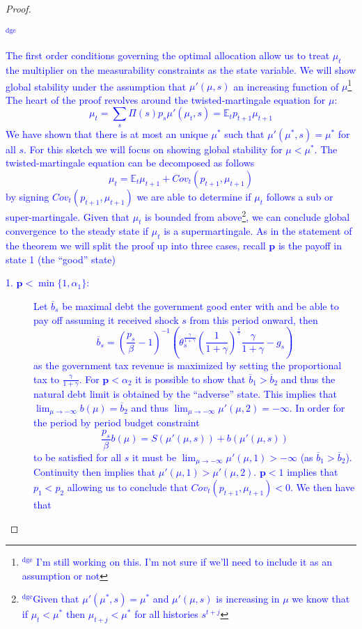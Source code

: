 \documentclass[12pt]{article}
\newcommand{\dge}[1]{\textcolor{blue}{$^{\textrm{dge}}${#1}}}
\newcommand{\EE}{\mathbb E}
\begin{document}
\begin{proof}\dge{The first order conditions governing the optimal allocation allow us to treat $\mu_t$ the multiplier on the measurability constraints as the state variable.  We will show global stability under the assumption that $\mu'(\mu,s)$ an increasing function of $\mu$\footnote{\dge{ I'm still working on this.  I'm not sure if we'll need to include it as an assumption or not}}  The heart of the proof revolves around the twisted-martingale equation for $\mu$:
\[
	\mu_t = \sum_s \Pi(s) p_s \mu'(\mu_t,s) = \EE_t p_{t+1}\mu_{t+1}
\]  We have shown that there is at most an unique $\mu^*$ such that $\mu'(\mu^*,s) = \mu^*$ for all $s$.  For this sketch we will focus on showing global stability for $\mu < \mu^*$.  The twisted-martingale equation can be decomposed as follows
\[ 
	\mu_t = \EE_t \mu_{t+1}+Cov_t(p_{t+1},\mu_{t+1})
\] by signing $Cov_t(p_{t+1},\mu_{t+1})$ we are able to determine if $\mu_t$ follows a sub or super-martingale.  Given that $\mu_t$ is bounded from above\footnote{\dge{Given that $\mu'(\mu^*,s) = \mu^*$ and $\mu'(\mu,s)$ is increasing in $\mu$  we know that if $\mu_t < \mu^*$ then $\mu_{t+j} < \mu^*$ for all histories $s^{t+j}$}}, we can conclude global convergence to the steady state if $\mu_t$ is a supermartingale.  As in the statement of the theorem we will split the proof up into three cases, recall $\bm p$ is the payoff in state 1 (the ``good'' state)
\begin{description}
	\item[1. $\bm p < \min\{1,\alpha_1\}$:]  Let $\overline b_s$ be maximal debt the government good enter with and be able to pay off assuming it received shock $s$ from this period onward, then
	\[
	\overline b_s = \left(\frac{p_s}{\beta}-1\right)^{-1}\left(\theta_s^\frac{\gamma}{1+\gamma}\left(\frac1{1+\gamma}\right)^\frac1\gamma\frac\gamma{1+\gamma}-g_s\right)
	\]as the government tax revenue is maximized by setting the proportional tax to $\frac\gamma{1+\gamma}$.  For $\bm p <\alpha_2$ it is possible to show that $\overline b_1 > \overline b_2$ and thus the natural debt limit is obtained by the ``adverse'' state.  This implies that $\lim_{\mu\rightarrow-\infty} b(\mu) = \overline b_2$ and thus $\lim_{\mu\rightarrow-\infty} \mu'(\mu,2) = -\infty$.  In order for the period by period budget constraint
	\[
		\frac{p_s}{\beta}b(\mu) = S(\mu'(\mu,s))+b(\mu'(\mu,s))
	\]to be satisfied for all $s$ it must be $\lim_{\mu\rightarrow -\infty} \mu'(\mu,1) >-\infty$ (as $\overline b_1 > \overline b_2$).  Continuity then implies that $\mu'(\mu,1) > \mu'(\mu,2)$.  $\bm p < 1$ implies that $p_1 < p_2$ allowing us to conclude that $Cov_t(p_{t+1},\mu_{t+1}) < 0$.  We then have that 

\end{description}}
\end{proof}
\end{document}
